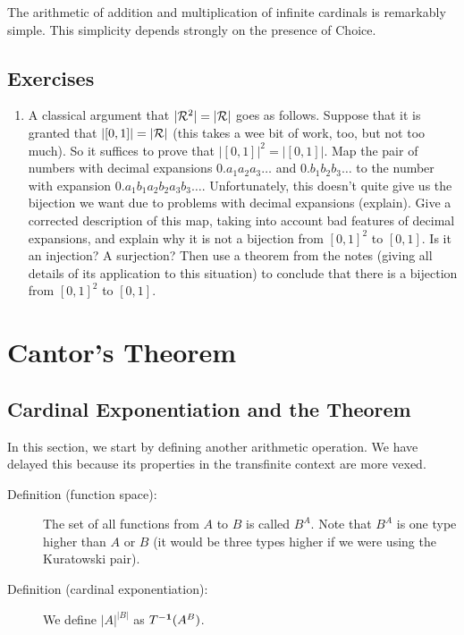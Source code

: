 \documentclass[12pt]{book}
\begin{document}
The arithmetic of addition and multiplication of infinite cardinals is
remarkably simple.  This simplicity depends strongly on the presence
of Choice.

\newpage

\subsection{Exercises}
\begin{enumerate}
\item A classical argument that $|{\cal R}^2| = |{\cal R}|$ goes as follows.
Suppose that it is granted that $|[0,1]| = |{\cal R}|$ (this takes a
wee bit of work, too, but not too much).  So it suffices to prove that
$|[0,1]|^2=|[0,1]|$.  Map the pair of numbers with decimal expansions
$0.a_1a_2a_3\ldots$ and $0.b_1b_2b_3\ldots$ to the number with
expansion $0.a_1b_1a_2b_2a_3b_3\ldots$.  Unfortunately, this doesn't
quite give us the bijection we want due to problems with decimal
expansions (explain).  Give a corrected description of this map,
taking into account bad features of decimal expansions, and explain
why it is not a bijection from $[0,1]^2$ to $[0,1]$.  Is it an
injection?  A surjection?  Then use a theorem from the notes (giving
all details of its application to this situation) to conclude that
there is a bijection from $[0,1]^2$ to $[0,1]$.
\end{enumerate}

\newpage

\section{Cantor's Theorem}

\subsection{Cardinal Exponentiation and the Theorem}

In this section, we start by defining another arithmetic operation.
We have delayed this because its properties in the transfinite context
are more vexed.

\begin{description}

\item[Definition (function space):] The set of all functions from $A$
to $B$ is called $B^A$.  Note that $B^A$ is one type higher than $A$
or $B$ (it would be three types higher if we were using the Kuratowski
pair).

\item[Definition (cardinal exponentiation):]  We define $|A|^{|B|}$ as $T^{\bf -1}(A^B)$.

\end{description}
\end{document}
